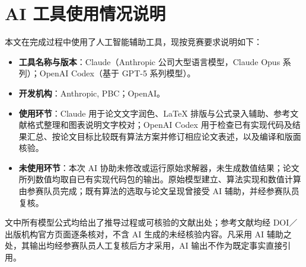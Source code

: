 \section*{AI 工具使用情况说明}

本文在完成过程中使用了人工智能辅助工具，现按竞赛要求说明如下：

\begin{itemize}[leftmargin=2em]
  \item \textbf{工具名称与版本}：Claude（Anthropic 公司大型语言模型，Claude Opus 系列）；OpenAI Codex（基于 GPT-5 系列模型）。
  \item \textbf{开发机构}：Anthropic, PBC；OpenAI。
  \item \textbf{使用环节}：Claude 用于论文文字润色、\LaTeX{} 排版与公式录入辅助、参考文献格式整理和图表说明文字校对；OpenAI Codex 用于检查已有实现代码及结果汇总、按论文目标比较既有算法方案并修订相应论文表述，以及编译和版面核验。
  \item \textbf{未使用环节}：本次 AI 协助未修改或运行原始求解器，未生成数值结果；论文所列数值均取自已有实现代码包的输出。原始模型建立、算法实现和数值计算由参赛队员完成；既有算法的选取与论文呈现曾接受 AI 辅助，并经参赛队员复核。
\end{itemize}

文中所有模型公式均给出了推导过程或可核验的文献出处；参考文献均经 DOI／出版机构官方页面逐条核对，不含 AI 生成的未经核验内容。凡采用 AI 辅助之处，其输出均经参赛队员人工复核后方才采用，AI 输出不作为既定事实直接引用。
